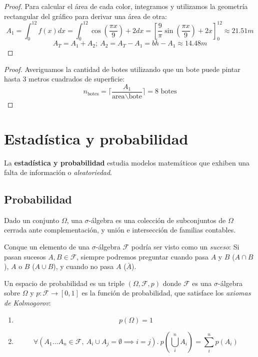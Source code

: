 \documentclass[10pt]{article}
\begin{document}
\begin{enumerate}
        \begin{proof}
          Para calcular el área de cada color, integramos y utilizamos la geometría rectangular del gráfico para derivar una área de otra:
          \[ A_1 = \int_0^{12} f(x) dx = \int_0^{12} \cos(\frac{\pi x}{9}) + 2 dx = \left[\frac{9}{\pi}\sin(\frac{\pi x}{9}) + 2x\right]_0^{12} \approx 21.51 m \]
          \[ A_T = A_1 + A_2; \ A_2 = A_T - A_1 = bh - A_1 \approx 14.48 m \]
        \end{proof}

        \begin{proof}
          Averiguamos la cantidad de botes utilizando que un bote puede pintar hasta 3 metros cuadrados de superficie:
          \[ n_{\text{botes}} = \lceil \frac{A_1}{\text{area}\backslash\text{bote}} \rceil = 8 \text{ botes}\]
        \end{proof}
\end{enumerate}

\newpage

\section{Estadística y probabilidad}

La \textbf{estadística y probabilidad} estudia modelos matemáticos que exhiben una falta de información o \textit{aleatoriedad}.

\subsection{Probabilidad}

\begin{definition}
  Dado un conjunto $ \Omega $, una $ \sigma $-álgebra es una colección de subconjuntos de $ \Omega $ cerrada ante complementación, y unión e intersección de familias contables.
\end{definition}

Conque un elemento de una $ \sigma $-álgebra $ \mathcal{F} $ podría ser visto como un \textit{suceso}: Si pasan sucesos $ A, B \in \mathcal{F} $, siempre podremos preguntar
cuando pasa $ A $ y $ B $ ($ A \cap B $), $ A $ o $ B $ ($ A \cup B $), y cuando no pasa $ A $ ($ \bar{A} $).

\begin{definition}
  Un espacio de probabilidad es un triple $ (\Omega, \mathcal{F}, p) $ donde $ \mathcal{F} $ es una $ \sigma $-álgebra sobre $ \Omega $ y $ p : \mathcal{F} \to \left[0, 1\right] $
  es la función de probabilidad, que satisface los \textit{axiomas de Kolmogorov}:
  \begin{enumerate}
    \item \[ p(\Omega) = 1 \]
    \item \[ \forall (A_1 \dots A_n \in \mathcal{F},\ A_i \cup A_j = \emptyset \implies i = j). \ p(\bigcup_i^n A_i) = \sum_i^n p(A_i) \]
  \end{enumerate}
\end{definition}
\end{document}

